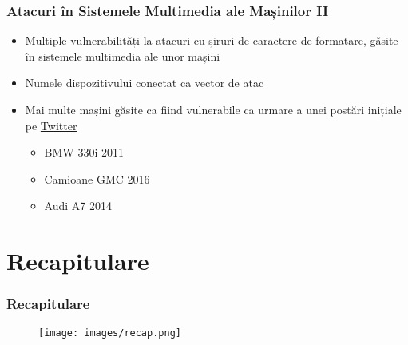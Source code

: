 \documentclass[xcolor={table}]{beamer}
\begin{document}
	\begin{frame}
		\frametitle{Atacuri în Sistemele Multimedia ale Mașinilor II}\pause
		\begin{itemize}[<+->]
		    \item Multiple vulnerabilități la atacuri cu șiruri de caractere de formatare, găsite în sistemele multimedia ale unor mașini
		    \item Numele dispozitivului conectat ca vector de atac
		    \item Mai multe mașini găsite ca fiind vulnerabile ca urmare a unei postări inițiale pe \href{https://twitter.com/0xRaindrop/status/864704956116254720}{Twitter}
    		    \begin{itemize}
    			    \item BMW 330i 2011
    			    \item Camioane GMC 2016
    			    \item Audi A7 2014 
    			\end{itemize}
		\end{itemize}
	\end{frame}

	\section{Recapitulare}

	\begin{frame}
		\frametitle{Recapitulare}\pause
		\begin{figure}
            \centering
            \texttt{[image: images/recap.png]}
        \end{figure}
	\end{frame}
\end{document}
